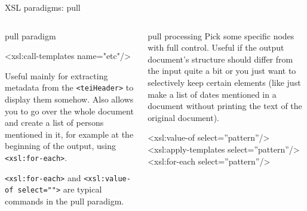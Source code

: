 \begin{frame}{XSL paradigms: pull}
\footnotesize

\begin{columns}
\begin{block}{pull paradigm}
\begin{xmlcode}
<xsl:call-templates name="etc"/>
\end{xmlcode}

Useful mainly for extracting metadata from the \texttt{<teiHeader>} to display them somehow. Also allows you to go over the whole document and create a list of persons mentioned in it, for example at the beginning of the output, using  \texttt{<xsl:for-each>}.\smallskip

\texttt{<xsl:for-each>} and \texttt{<xsl:value-of select="">} are typical commands in the pull paradigm.

\end{block} 

\begin{block}{ pull processing}
Pick some specific nodes with full control. Useful if the output document's structure should differ from the input quite a bit or you just want to selectively keep certain elements (like just make a list of dates mentioned in a document without printing the text of the original document). 

\begin{xmlcode}
<xsl:value-of select=''pattern''/>
<xsl:apply-templates select=''pattern''/>
<xsl:for-each select=''pattern''/>
\end{xmlcode}
\end{block}
\end{columns}


\end{frame}

